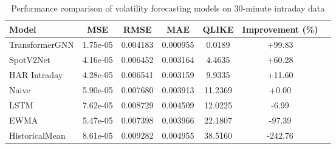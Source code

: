 \documentclass[journal]{IEEEtran}
\begin{document}
\begin{table}[!t]
\centering
\caption{Performance comparison of volatility forecasting models on 30-minute intraday data}
\label{tab:main_results}
\begin{tabular}{@{}lcccccc@{}}
\toprule
Model & MSE & RMSE & MAE & QLIKE & Improvement (\%) \\
\midrule
TransformerGNN & 1.75e-05 & 0.004183 & 0.000955 & 0.0189 & +99.83 \\
SpotV2Net & 4.16e-05 & 0.006452 & 0.003164 & 4.4635 & +60.28 \\
HAR Intraday & 4.28e-05 & 0.006541 & 0.003159 & 9.9335 & +11.60 \\
\rowcolor{bestcolor}Naive & 5.90e-05 & 0.007680 & 0.003913 & 11.2369 & +0.00 \\
LSTM & 7.62e-05 & 0.008729 & 0.004509 & 12.0225 & -6.99 \\
EWMA & 5.47e-05 & 0.007398 & 0.003966 & 22.1807 & -97.39 \\
HistoricalMean & 8.61e-05 & 0.009282 & 0.004955 & 38.5160 & -242.76 \\
\bottomrule
\end{tabular}
\end{table}
\end{document}
